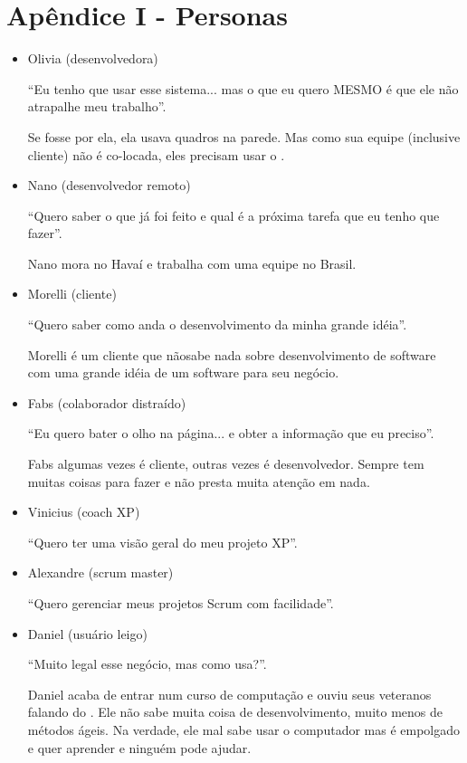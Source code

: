 \section{Apêndice I - Personas}
\label{sec:personas}

\begin{itemize}
	\item{Olivia (desenvolvedora)
	
	``Eu tenho que usar esse sistema... mas o que eu quero MESMO é que ele não atrapalhe meu
	trabalho''.
	
	Se fosse por ela, ela usava quadros na parede. Mas como sua equipe (inclusive cliente) não é co-locada, eles
	precisam usar o \calopsita.}
	\item{Nano (desenvolvedor remoto)
	
	``Quero saber o que já foi feito e qual é a próxima tarefa que eu tenho que fazer''.
	
	Nano mora no Havaí e trabalha com uma equipe no Brasil.}
	\item{Morelli (cliente)
	
	``Quero saber como anda o desenvolvimento da minha grande idéia''. 
	
	Morelli é um cliente que nãosabe nada sobre desenvolvimento de software com uma grande idéia de um software para seu negócio.}
	\item{Fabs (colaborador distraído)
	
	``Eu quero bater o olho na página... e obter a informação que eu preciso''.
	
	Fabs algumas vezes é cliente, outras vezes é desenvolvedor. Sempre tem muitas coisas para fazer e não presta muita
	atenção em nada.}
	\item{Vinicius (coach XP)
	
	``Quero ter uma visão geral do meu projeto XP''.}
	\item{Alexandre (scrum master)
	
	``Quero gerenciar meus projetos Scrum com facilidade''.}
	\item{Daniel (usuário leigo)
	
	``Muito legal esse negócio, mas como usa?''. 
	
	Daniel acaba de entrar num curso de computação e ouviu seus veteranos falando do \calopsita. Ele não sabe 
	muita coisa de desenvolvimento, muito menos de métodos ágeis. Na verdade, ele mal sabe usar o computador 
	mas é empolgado e quer aprender e ninguém pode ajudar.}
\end{itemize}
